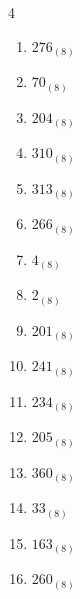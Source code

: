 \begin{multicols}{4}
\begin{enumerate}
  \item $276_{(8)}$

        \phantom{$=190$}

  \item $70_{(8)}$

        \phantom{$=56$}

  \item $204_{(8)}$

        \phantom{$=132$}

\columnbreak %

  \item $310_{(8)}$

        \phantom{$=200$}

  \item $313_{(8)}$

        \phantom{$=203$}

  \item $266_{(8)}$

        \phantom{$=182$}

  \item $4_{(8)}$

        \phantom{$=4$}

  \item $2_{(8)}$

        \phantom{$=2$}

  \item $201_{(8)}$

        \phantom{$=129$}

  \item $241_{(8)}$

        \phantom{$=161$}

  \item $234_{(8)}$

        \phantom{$=156$}

  \item $205_{(8)}$

        \phantom{$=133$}

  \item $360_{(8)}$

        \phantom{$=240$}

  \item $33_{(8)}$

        \phantom{$=27$}

  \item $163_{(8)}$

        \phantom{$=115$}

  \item $260_{(8)}$


\end{enumerate}
\end{multicols}
